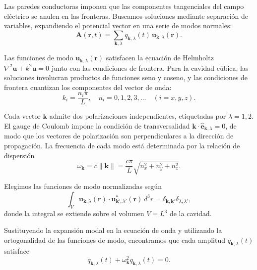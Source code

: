         Las paredes conductoras imponen que las componentes tangenciales del campo eléctrico se anulen en las fronteras. Buscamos soluciones mediante separación de variables, expandiendo el potencial vector en una serie de modos normales:
        \begin{equation}
            \mathbf{A}(\mathbf{r}, t) = \sum_{\mathbf{k},\lambda} q_{\mathbf{k},\lambda}(t) \, \mathbf{u}_{\mathbf{k},\lambda}(\mathbf{r}).
        \end{equation}
        
        Las funciones de modo $\mathbf{u}_{\mathbf{k},\lambda}(\mathbf{r})$ satisfacen la ecuación de Helmholtz $\nabla^2 \mathbf{u} + k^2 \mathbf{u} = 0$ junto con las condiciones de frontera. Para la cavidad cúbica, las soluciones involucran productos de funciones seno y coseno, y las condiciones de frontera cuantizan los componentes del vector de onda:
        \begin{equation}
            k_i = \frac{n_i \pi}{L}, \quad n_i = 0, 1, 2, 3, \ldots \quad (i = x, y, z).
        \end{equation}
        
        Cada vector $\mathbf{k}$ admite dos polarizaciones independientes, etiquetadas por $\lambda = 1, 2$. El gauge de Coulomb impone la condición de transversalidad $\mathbf{k} \cdot \hat{\boldsymbol{e}}_{\mathbf{k},\lambda} = 0$, de modo que los vectores de polarización son perpendiculares a la dirección de propagación. La frecuencia de cada modo está determinada por la relación de dispersión
        \begin{equation}
            \omega_{\mathbf{k}} = c\|\mathbf{k}\| = \frac{c\pi}{L}\sqrt{n_x^2 + n_y^2 + n_z^2}.
        \end{equation}
        
        Elegimos las funciones de modo normalizadas según
        \begin{equation}
            \int_V \mathbf{u}_{\mathbf{k},\lambda}(\mathbf{r}) \cdot \mathbf{u}_{\mathbf{k}',\lambda'}^*(\mathbf{r}) \, d^3r = \delta_{\mathbf{k},\mathbf{k}'}\delta_{\lambda,\lambda'},
        \end{equation}
        donde la integral se extiende sobre el volumen $V = L^3$ de la cavidad.
        
        Sustituyendo la expansión modal en la ecuación de onda y utilizando la ortogonalidad de las funciones de modo, encontramos que cada amplitud $q_{\mathbf{k},\lambda}(t)$ satisface
        \begin{equation}
            \ddot{q}_{\mathbf{k},\lambda}(t) + \omega_{\mathbf{k}}^2 q_{\mathbf{k},\lambda}(t) = 0.
        \end{equation}
        
